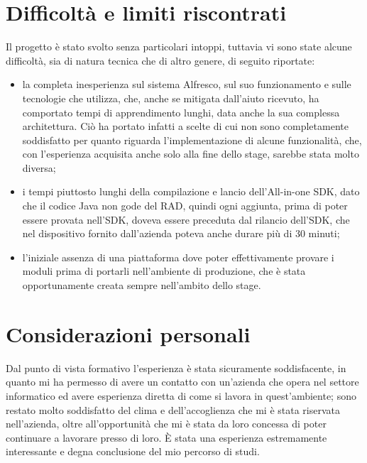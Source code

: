 \section{Difficoltà e limiti riscontrati}
Il progetto è stato svolto senza particolari intoppi, tuttavia vi sono state alcune difficoltà, sia di natura tecnica che di altro genere, di seguito riportate:
\begin{itemize}
\item la completa inesperienza sul sistema Alfresco, sul suo funzionamento e sulle tecnologie che utilizza, che, anche se mitigata dall'aiuto ricevuto, ha comportato tempi di apprendimento lunghi, data anche la sua complessa architettura.
Ciò ha portato infatti a scelte di cui non sono completamente soddisfatto per quanto riguarda l'implementazione di alcune funzionalità, che, con l'esperienza acquisita anche solo alla fine dello stage, sarebbe stata molto diversa;
\item i tempi piuttosto lunghi della compilazione e lancio dell'All-in-one SDK, dato che il codice Java non gode del RAD, quindi ogni aggiunta, prima di poter essere provata nell'SDK, doveva essere preceduta dal rilancio dell'SDK, che nel dispositivo fornito dall'azienda poteva anche durare più di 30 minuti;
\item l'iniziale assenza di una piattaforma dove poter effettivamente provare i moduli prima di portarli nell'ambiente di produzione, che è stata opportunamente creata sempre nell'ambito dello stage.
\end{itemize}
\section{Considerazioni personali}
Dal punto di vista formativo l'esperienza è stata sicuramente soddisfacente, in quanto mi ha permesso di avere un contatto con un'azienda che opera nel settore informatico ed avere esperienza diretta di come si lavora in quest'ambiente; sono restato molto soddisfatto del clima e dell'accoglienza che mi è stata riservata nell'azienda, oltre all'opportunità che mi è stata da loro concessa di poter continuare a lavorare presso di loro.
È stata una esperienza estremamente interessante e degna conclusione del mio percorso di studi.